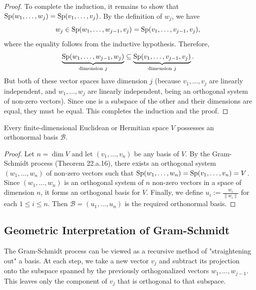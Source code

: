 \begin{proof}
    To complete the induction, it remains to show that $\operatorname{Sp}(w_1, \dots, w_j) = \operatorname{Sp}(v_1, \dots, v_j)$. By the definition of $w_j$, we have
    \begin{equation*}
        w_j \in \operatorname{Sp}(w_1, \dots, w_{j-1}, v_j) = \operatorname{Sp}(v_1, \dots, v_{j-1}, v_j),
    \end{equation*}
    where the equality follows from the inductive hypothesis. Therefore,
    \begin{equation*}
        \underbrace{\operatorname{Sp}(w_1, \dots, w_{j-1}, w_j)}_{\text{dimension } j} \subseteq \underbrace{\operatorname{Sp}(v_1, \dots, v_{j-1}, v_j)}_{\text{dimension } j}.
    \end{equation*}
    But both of these vector spaces have dimension $j$ (because $v_1, \dots, v_j$ are linearly independent, and $w_1, \dots, w_j$ are linearly independent, being an orthogonal system of non-zero vectors). Since one is a subspace of the other and their dimensions are equal, they must be equal. This completes the induction and the proof.
\end{proof}

\begin{corollary}
    Every finite-di\-men\-sional Euclidean or Hermitian space $V$ possesses an orthonormal basis $\mathcal{B}$.
\end{corollary}

\begin{proof}
    Let $n = \dim V$ and let $(v_1, \dots, v_n)$ be any basis of $V$. By the Gram-Schmidt process (Theorem 22.a.16), there exists an orthogonal system $(w_1, \dots, w_n)$ of non-zero vectors such that $\operatorname{Sp}(w_1, \dots, w_n) = \operatorname{Sp}(v_1, \dots, v_n) = V$.
    Since $(w_1, \dots, w_n)$ is an orthogonal system of $n$ non-zero vectors in a space of dimension $n$, it forms an orthogonal basis for $V$.
    Finally, we define $u_i := \frac{w_i}{\|w_i\|}$ for each $1 \leq i \leq n$. Then $\mathcal{B} = (u_1, \dots, u_n)$ is the required orthonormal basis.
\end{proof}

\subsection{Geometric Interpretation of Gram-Schmidt}

The Gram-Schmidt process can be viewed as a recursive method of "straightening out" a basis. At each step, we take a new vector $v_j$ and subtract its projection onto the subspace spanned by the previously orthogonalized vectors $w_1, \dots, w_{j-1}$. This leaves only the component of $v_j$ that is orthogonal to that subspace.

